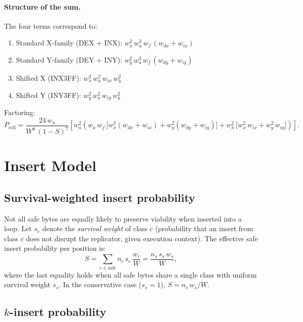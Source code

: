\documentclass{article}
\newcommand{\wa}{w_a}
\newcommand{\wf}{w_f}
\newcommand{\wx}{w_x}
\newcommand{\wy}{w_y}
\newcommand{\wix}{w_{ix}}
\newcommand{\wiy}{w_{iy}}
\newcommand{\wdx}{w_{dx}}
\newcommand{\wdy}{w_{dy}}
\newcommand{\wh}{w_h}
\newcommand{\ws}{w_s}
\newcommand{\wu}{w_u}
\begin{document}
\paragraph{Structure of the sum.}
The four terms correspond to:
\begin{enumerate}
\item Standard X-family (DEX + INX): $\wx^2\,\wa^3\,\wf\,(\wdx + \wix)$
\item Standard Y-family (DEY + INY): $\wy^2\,\wa^3\,\wf\,(\wdy + \wiy)$
\item Shifted X (INX3FF): $\wx^2\,\wa^2\,\wix\,\wh^2$
\item Shifted Y (INY3FF): $\wy^2\,\wa^2\,\wiy\,\wh^2$
\end{enumerate}

Factoring:
\begin{equation}
P_{\text{cell}} = \frac{24\,\wu}{W^8\,(1-S)^7}
  \left[
    \wa^2 \left(
      \wa\,\wf\,\bigl[\wx^2(\wdx{+}\wix) + \wy^2(\wdy{+}\wiy)\bigr]
    + \wh^2\,\bigl[\wx^2\,\wix + \wy^2\,\wiy\bigr]
    \right)
  \right].
\label{eq:pcell_factored}
\end{equation}

\section{Insert Model}
\label{sec:inserts}

\subsection{Survival-weighted insert probability}

Not all safe bytes are equally likely to preserve viability when
inserted into a loop.  Let $s_c$ denote the \emph{survival weight}
of class $c$ (probability that an insert from class $c$ does not
disrupt the replicator, given execution context).  The effective
safe insert probability per position is:
\begin{equation}
S = \sum_{c \in \text{safe}} n_c \, s_c \, \frac{w_c}{W}
  = \frac{n_s \, s_s \, \ws}{W},
\label{eq:S}
\end{equation}
where the last equality holds when all safe bytes share a single
class with uniform survival weight $s_s$.
In the conservative case ($s_s = 1$), $S = n_s\,\ws / W$.

\subsection{$k$-insert probability}
\end{document}
